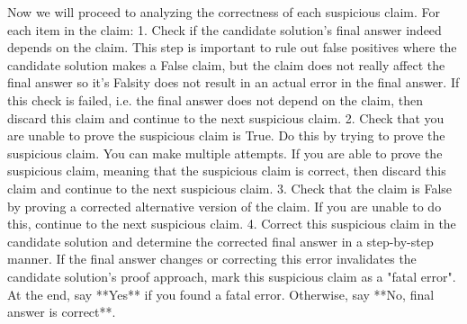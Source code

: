 \begin{tcolorbox}[breakable,title=Verification Prompt 4]
Now we will proceed to analyzing the correctness of each suspicious claim. For each item in the claim:
1. Check if the candidate solution's final answer indeed depends on the claim. This step is important to rule out false positives where the candidate solution makes a False claim, but the claim does not really affect the final answer so it's Falsity does not result in an actual error in the final answer. If this check is failed, i.e. the final answer does not depend on the claim, then discard this claim and continue to the next suspicious claim.
2. Check that you are unable to prove the suspicious claim is True. Do this by trying to prove the suspicious claim. You can make multiple attempts. If you are able to prove the suspicious claim, meaning that the suspicious claim is correct, then discard this claim and continue to the next suspicious claim.
3. Check that the claim is False by proving a corrected alternative version of the claim. If you are unable to do this, continue to the next suspicious claim.
4. Correct this suspicious claim in the candidate solution and determine the corrected final answer in a step-by-step manner. If the final answer changes or correcting this error invalidates the candidate solution's proof approach, mark this suspicious claim as a "fatal error".
At the end, say **Yes** if you found a fatal error. Otherwise, say **No, final answer is correct**.
\end{tcolorbox}

